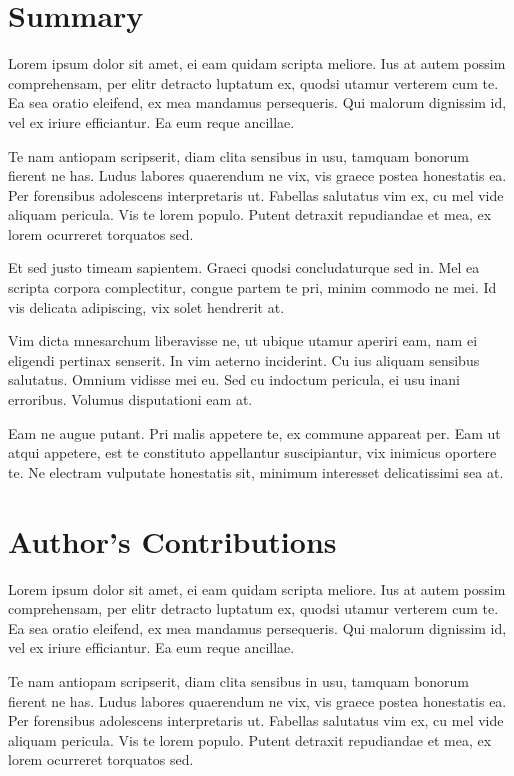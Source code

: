\documentclass[12pt, a4paper]{article}
\theoremstyle{definition}
\theoremstyle{remark}
\numberwithin{equation}{section}
\numberwithin{figure}{section}
\numberwithin{table}{section}
\begin{document}
    \newpage
    \section*{Summary}
        Lorem ipsum dolor sit amet, ei eam quidam scripta meliore. Ius at autem possim comprehensam, per elitr detracto luptatum ex, quodsi utamur verterem cum te. Ea sea oratio eleifend, ex mea mandamus persequeris. Qui malorum dignissim id, vel ex iriure efficiantur. Ea eum reque ancillae.

        Te nam antiopam scripserit, diam clita sensibus in usu, tamquam bonorum fierent ne has. Ludus labores quaerendum ne vix, vis graece postea honestatis ea. Per forensibus adolescens interpretaris ut. Fabellas salutatus vim ex, cu mel vide aliquam pericula. Vis te lorem populo. Putent detraxit repudiandae et mea, ex lorem ocurreret torquatos sed.

        Et sed justo timeam sapientem. Graeci quodsi concludaturque sed in. Mel ea scripta corpora complectitur, congue partem te pri, minim commodo ne mei. Id vis delicata adipiscing, vix solet hendrerit at.

        Vim dicta mnesarchum liberavisse ne, ut ubique utamur aperiri eam, nam ei eligendi pertinax senserit. In vim aeterno inciderint. Cu ius aliquam sensibus salutatus. Omnium vidisse mei eu. Sed cu indoctum pericula, ei usu inani erroribus. Volumus disputationi eam at.

        Eam ne augue putant. Pri malis appetere te, ex commune appareat per. Eam ut atqui appetere, est te constituto appellantur suscipiantur, vix inimicus oportere te. Ne electram vulputate honestatis sit, minimum interesset delicatissimi sea at.

    \newpage
    \section*{Author's Contributions}
        Lorem ipsum dolor sit amet, ei eam quidam scripta meliore. Ius at autem possim comprehensam, per elitr detracto luptatum ex, quodsi utamur verterem cum te. Ea sea oratio eleifend, ex mea mandamus persequeris. Qui malorum dignissim id, vel ex iriure efficiantur. Ea eum reque ancillae.

        Te nam antiopam scripserit, diam clita sensibus in usu, tamquam bonorum fierent ne has. Ludus labores quaerendum ne vix, vis graece postea honestatis ea. Per forensibus adolescens interpretaris ut. Fabellas salutatus vim ex, cu mel vide aliquam pericula. Vis te lorem populo. Putent detraxit repudiandae et mea, ex lorem ocurreret torquatos sed.
\end{document}
